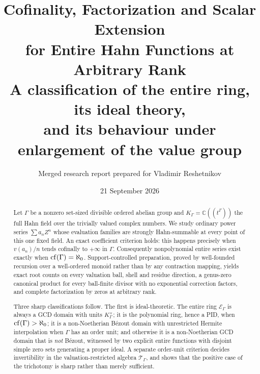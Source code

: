\documentclass[11pt]{article}
\title{\textbf{Cofinality, Factorization and Scalar Extension\\
for Entire Hahn Functions at Arbitrary Rank}\\[5pt]
\large A classification of the entire ring, its ideal theory,\\
and its behaviour under enlargement of the value group}
\author{Merged research report prepared for Vladimir Reshetnikov}
\date{21 September 2026}
\theoremstyle{plain}
\theoremstyle{plain}
\theoremstyle{plain}
\theoremstyle{definition}
\theoremstyle{definition}
\theoremstyle{definition}
\theoremstyle{definition}
\theoremstyle{remark}
\newcommand{\C}{\mathbb C}\newcommand{\R}{\mathbb R}
\newcommand{\K}{K_\Gamma}\newcommand{\KD}{K_\Delta}
\newcommand{\E}{\mathcal E_\Gamma}
\newcommand{\TT}{\mathcal T_\Gamma}
\begin{document}
\maketitle
\begin{abstract}
Let $\Gamma$ be a nonzero set-sized divisible ordered abelian group and
$\K=\C((t^\Gamma))$ the full Hahn field over the trivially valued complex
numbers. We study ordinary power series $\sum a_nZ^n$ whose evaluation
families are strongly Hahn-summable at every point of this one fixed
field. An exact coefficient criterion holds: this happens precisely when
$v(a_n)/n$ tends cofinally to $+\infty$ in $\Gamma$. Consequently
nonpolynomial entire series exist exactly when $\operatorname{cf}(\Gamma)=\aleph_0$.
Support-controlled preparation, proved by well-founded recursion over a
well-ordered monoid rather than by any contraction mapping, yields exact
root counts on every valuation ball, shell and residue direction, a
genus-zero canonical product for every ball-finite divisor with no
exponential correction factors, and complete factorization by zeros at
arbitrary rank.

Three sharp classifications follow. The first is ideal-theoretic. The entire
ring $\E$ is always a GCD domain with units $\K^\times$; it is the
polynomial ring, hence a PID, when $\operatorname{cf}(\Gamma)>\aleph_0$; it is a
non-Noetherian B\'ezout domain with unrestricted Hermite interpolation when
$\Gamma$ has an order unit; and otherwise it is a non-Noetherian GCD domain
that is \emph{not} B\'ezout, witnessed by two explicit entire functions with
disjoint simple zero sets generating a proper ideal. A separate order-unit
criterion decides invertibility in the valuation-restricted algebra
$\TT$, and shows that the positive case of the trichotomy is sharp rather
than merely sufficient.


\end{abstract}
\end{document}
